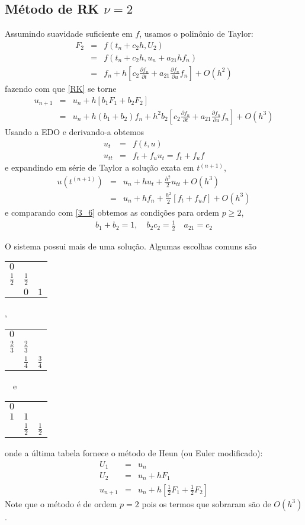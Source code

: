 \subsection{Método de RK $\nu =2$}
Assumindo suavidade suficiente em $f$, usamos o polinônio de Taylor:
\begin{eqnarray}
F_2 &=&f(t_n+c_2h,U_2)\\
   &=&f(t_n+c_2h,u_n+ a_{21}h f_n)\\
   &=&f_n +h[c_2 \frac{\partial f_n}{\partial t}+ a_{21} \frac{\partial f_n}{\partial u} f_n]+O(h^2)
\end{eqnarray}
fazendo com que \eqref{RK} se torne
\begin{eqnarray}
  u_{n+1}&=&u_n  + h [ b_1 F_1+b_2F_2] \\
         &=&u_n  + h(b_1+b_2)f_n +h^2b_2[c_2 \frac{\partial f_n}{\partial t}+ a_{21} \frac{\partial f_n}{\partial u} f_n]+O(h^3) \label{3_6}
\end{eqnarray}
Usando a EDO e derivando-a obtemos
\begin{eqnarray}
  u_t    &=&f(t,u)\\
  u_{tt} &=&f_t+f_uu_t = f_t+f_uf
\end{eqnarray}
e expandindo em série de Taylor a solução exata em $t^{(n+1)}$,
\begin{eqnarray}
  u(t^{(n+1)})&=&u_n  + hu_t +\frac{h^2}{2}u_{tt} + O(h^3)\\
            &=&u_n  + hf_n +\frac{h^2}{2}[f_t+f_uf]+O(h^3)
\end{eqnarray}
e comparando com \eqref{3_6} obtemos as condições para ordem $p\geq 2$,
\begin{eqnarray}
  b_1+b_2=1, \quad b_2c_2 = \frac{1}{2} \quad a_{21}=c_2
\end{eqnarray}

O sistema possui mais de uma solução. Algumas escolhas comuns são
\begin{center}
\begin{tabular}{c|cc}
  $0$ &     &   \\
  $\frac{1}{2}$ & $\frac{1}{2}$ &   \\  \hline
      & $0$ & $1$
\end{tabular},~~~~
\begin{tabular}{c|cc}
  $0$ &   &   \\
  $\frac{2}{3}$ & $\frac{2}{3}$ &   \\  \hline
    & $\frac{1}{4}$ & $\frac{3}{4}$
\end{tabular} ~~e~~
\begin{tabular}{c|cc}
  $0$ &   &   \\
  $1$ & $1$ &   \\  \hline
      & $\frac{1}{2}$ &$\frac{1}{2}$
\end{tabular}
\end{center}
onde a última tabela fornece o método de Heun (ou Euler modificado):
\begin{eqnarray}
  U_1 &=&u_n \\
  U_2 &=&u_n  + h F_1 \\
  u_{n+1}&=&u_n  + h [ \frac{1}{2} F_1+\frac{1}{2}F_2]
\end{eqnarray}
Note que o método é de ordem $p=2$ pois os termos que sobraram são de $O(h^3)$.


